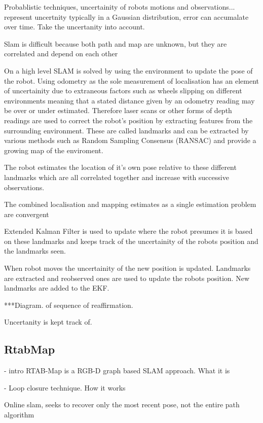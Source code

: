 \documentclass{mproj}
\begin{document}
Probablistic techniques, uncertainity of robots motions and observations... represent uncertnity typically in a Gaussian distribution, error can accumalate over time. Take the uncertanity into account.

Slam is difficult because both path and map are unknown, but they are correlated and depend on each other





On a high level SLAM is solved by using the environment to update the pose of the robot. Using odometry as the sole measurement of localisation has an element of uncertainity due to extraneous factors such as wheels slipping on different environments meaning that a stated distance given by an odometry reading may be over or under estimated. Therefore laser scans or other forms of depth readings are used to correct the robot's position by extracting features from the surrounding environment. These are called landmarks and can be extracted by various methods such as Random Sampling Consensus (RANSAC) and provide a growing map of the enviroment. 


The robot estimates the location of it's own pose relative to these different landmarks which are all correlated together and increase with successive observations. \cite{Hugh1988}
  
The combined localisation and mapping estimates as a single estimation problem are convergent  
  
  Extended Kalman Filter is used to update where the robot presumes it is based on these landmarks and keeps track of the uncertainity of the robots position and the landmarks seen.
  
  When robot moves the uncertainity of the new position is updated.
  Landmarks are extracted and reobserved ones are used to update the robots position. New landmarks are added to the EKF. 
  
  ***Diagram. of sequence of reaffirmation.


Uncertanity is kept track of.



\subsection{RtabMap}

- intro RTAB-Map is a RGB-D graph based SLAM approach. What it is

- Loop closure technique. How it works

Online slam, seeks to recover only the most recent pose, not the entire path algorithm
\end{document}
